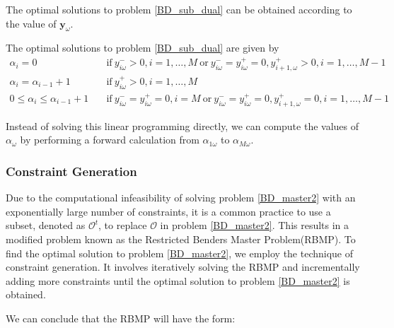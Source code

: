 The optimal solutions to problem \eqref{BD_sub_dual} can be obtained according to the value of $\mathbf{y}_{\omega}$.

\begin{prop}\label{optimal_sol_sub_dual}
  The optimal solutions to problem \eqref{BD_sub_dual} are given by 
\begin{equation}\label{BD_sub_simplified}
  \begin{aligned}
    \alpha_{i} = 0 \quad & \text{if}~  y_{i \omega}^{-} > 0,  i =1,\ldots, M~\text{or}~ y_{i \omega}^{-} = y_{i \omega}^{+} = 0, y_{i+1, \omega}^{+}> 0, i = 1,\ldots, M-1 \\
    \alpha_{i} = \alpha_{i-1}+1 \quad & \text{if}~ y_{i \omega}^{+} > 0, i =1,\ldots, M \\
    0 \leq \alpha_{i} \leq \alpha_{i-1}+1 \quad & \text{if}~ y_{i \omega}^{-} = y_{i \omega}^{+} = 0, i = M~\text{or}~ y_{i \omega}^{-} = y_{i \omega}^{+} = 0, y_{i+1, \omega}^{+}= 0, i = 1,\ldots, M-1
  \end{aligned}
\end{equation}
\end{prop}


Instead of solving this linear programming directly, we can compute the values of $\alpha_{\omega}$ by performing a forward calculation from $\alpha_{1\omega}$ to $\alpha_{M\omega}$.

\subsubsection{Constraint Generation}\label{bender_stage}

Due to the computational infeasibility of solving problem \eqref{BD_master2} with an exponentially large number of constraints, it is a common practice to use a subset, denoted as $\mathcal{O}^t$, to replace $\mathcal{O}$ in problem \eqref{BD_master2}. This results in a modified problem known as the Restricted Benders Master Problem(RBMP). To find the optimal solution to problem \eqref{BD_master2}, we employ the technique of constraint generation. It involves iteratively solving the RBMP and incrementally adding more constraints until the optimal solution to problem \eqref{BD_master2} is obtained.


We can conclude that the RBMP will have the form:

